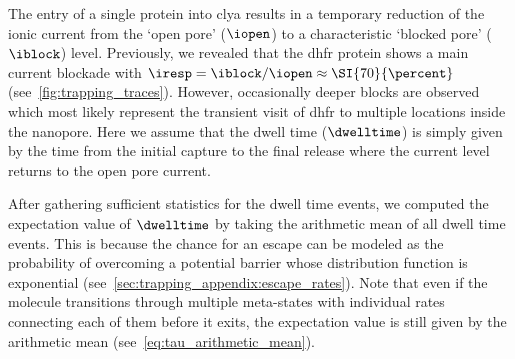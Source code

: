 The entry of a single protein into \gls{clya} results in a temporary reduction of the ionic current from the
`open pore' ($\iopen$) to a characteristic `blocked pore' ($\iblock$) level. Previously, we revealed that the
\gls{dhfr} protein shows a main current blockade with $\iresp = \iblock / \iopen \approx \SI{70}{\percent}$
(see~\cref{fig:trapping_traces}). However, occasionally deeper blocks are observed which most likely represent
the transient visit of \gls{dhfr} to multiple locations inside the nanopore. Here we assume that the dwell
time ($\dwelltime$) is simply given by the time from the initial capture to the final release where the
current level returns to the open pore current.

After gathering sufficient statistics for the dwell time events, we computed the expectation value of
$\dwelltime$ by taking the arithmetic mean of all dwell time events. This is because the chance for an escape
can be modeled as the probability of overcoming a potential barrier whose distribution function is exponential
(see~\cref{sec:trapping_appendix:escape_rates}). Note that even if the molecule transitions through multiple
meta-states with individual rates connecting each of them before it exits, the expectation value is still
given by the arithmetic mean (see~\cref{eq:tau_arithmetic_mean}).


